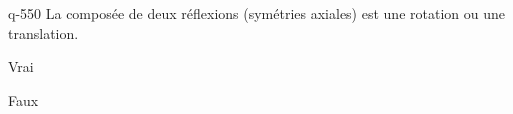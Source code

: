 \begin{truefalse}{q-550}
La composée de deux réflexions (symétries axiales) est une rotation ou une translation.
\item* Vrai
\item Faux
\end{truefalse}


